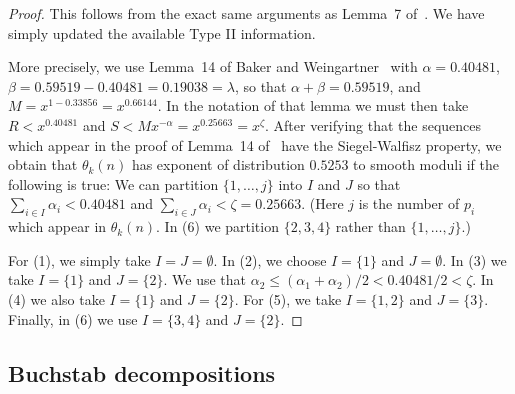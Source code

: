 \documentclass{amsart}
\numberwithin{equation}{section}
\begin{document}
\begin{proof}
This follows from the exact same arguments as Lemma~7 of~\cite{Baker:2017:BIP}. We have simply updated the available Type II information. 

\vspace{3mm} More precisely, we use Lemma~14 of Baker and Weingartner~\cite{Baker:2014:TDI} with $\alpha = 0.40481$, $\beta = 0.59519-0.40481=0.19038 = \lambda$, so that $\alpha + \beta
 = 0.59519$, and $M = x^{1-0.33856} = x^{0.66144 }$. In the notation of that lemma we must then take $R < x^{0.40481}$ and $S< Mx^{-\alpha} = x^{0.25663} = x^\zeta$.  After verifying that the sequences which appear in the proof of Lemma~14 of~\cite{Baker:2014:TDI} have the Siegel-Walfisz property, we  obtain that $\theta_k(n)$ has exponent of distribution $0.5253$ to smooth moduli if the following is true: We can partition $\{1, \dots, j\}$ into $I$ and $J$ so that $\sum_{i \in I} \alpha_i <0.40481$ and $\sum_{i \in J} \alpha_i < \zeta =0.25663$. (Here $j$ is the number of $p_i$ which appear in $\theta_k(n)$. In (6) we partition $\{2,3,4\}$ rather than  $\{1, \dots, j\}$.)
 
 \vspace{3mm} For (1), we  simply take $I=J=\emptyset$. In (2),  we choose $I=\{1\}$ and $J=\emptyset$. In (3) we take $I = \{1\}$ and $J = \{2\}$. We use that $\alpha_2 \leq (\alpha_1+\alpha_2)/2 < 0.40481/2 <\zeta$. In (4) we also take $I = \{1\}$ and $J = \{2\}$. For (5), we take $I = \{1,2\}$ and $J =\{3\} $. Finally, in (6) we use $I=\{3,4\}$ and $J=\{2\}$. 
\end{proof}

\subsection{Buchstab decompositions} \label{ssec:buchstab}
\end{document}
